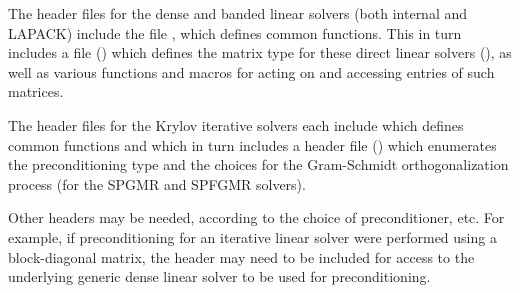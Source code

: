\documentclass[letterpaper,10pt,english]{sphinxmanual}
\begin{document}
The header files for the dense and banded linear solvers (both
internal and LAPACK) include the file , which defines
common functions.  This in turn includes a file ()
which defines the matrix type for these direct linear solvers
(), as well as various functions and macros for acting on and
accessing entries of such matrices.

The header files for the Krylov iterative solvers each include
 which defines common functions and which in turn
includes a header file () which enumerates the
preconditioning type and the choices for the Gram-Schmidt
orthogonalization process (for the SPGMR and SPFGMR solvers).

Other headers may be needed, according to the choice of
preconditioner, etc.  For example, if preconditioning for an iterative
linear solver were performed using a block-diagonal
matrix, the header  may need to be included for
access to the underlying generic dense linear solver to be used for
preconditioning.
\end{document}
